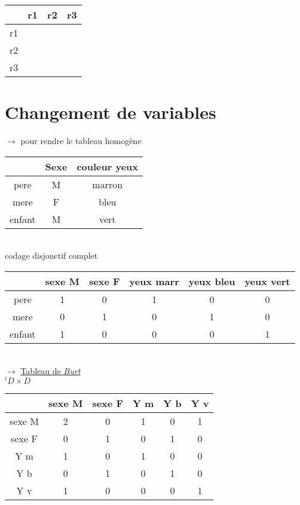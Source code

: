 \documentclass[a4paper]{report}
\begin{document}
\begin{tabular}
  {c|c|c|c}
  &r1&r2&r3\\
  \hline
  r1&&&\\
  \hline
  r2&&&\\
  \hline
  r3&&&\\

\end{tabular}

\section{Changement de variables}
$\rightarrow$ pour rendre le tableau homogène \hspace{4cm}
\begin{tabular}
  {c|c|c|}
  &Sexe&couleur yeux\\
  \hline
  pere&M&marron\\
  \hline
  mere&F&bleu\\
  \hline
  enfant&M&vert\\
\end{tabular}\\

codage disjonctif complet\\

\begin{tabular}
  {c|c|c|c|c|c|}
  &sexe M&sexe F & yeux marr & yeux bleu & yeux vert \\
  \hline
  pere&1&0&1&0&0\\
  mere&0&1&0&1&0\\
  enfant&1&0&0&0&1\\
  \hline
\end{tabular}\\

$\longrightarrow$ \underline{Tableau de \emph{Burt}}\\

$^{t}D \times D$\\


\begin{tabular}
  {c|c|c|c|c|c|}
  &sexe M&sexe F&Y m&Y b&Y v\\
  \hline
  sexe M&2&0&1&0&1\\
  \hline
  sexe F&0&1&0&1&0\\
  \hline
  Y m&1&0&1&0&0\\
  \hline
  Y b&0&1&0&1&0\\
  \hline
  Y v&1&0&0&0&1\\
  \hline
\end{tabular}\\
\end{document}
